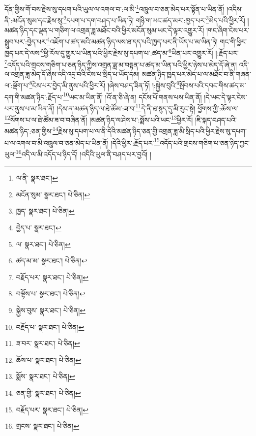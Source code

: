 དོན་གྱིས་གོ་བས་རྗེས་སུ་དཔག་པའི་ཡུལ་ལ་འགལ་བ་:ལ་མི་\footnote{ལ་ནི་  སྣར་ཐང་། }འཁྲུལ་བ་ཅན་མེད་པར་སྟོན་པ་ཡིན་ནོ། །འདིས་ནི་:མངོན་སུམ་དང་རྗེས་སུ་\footnote{མངོན་སུམ་  སྣར་ཐང་།  པེ་ཅིན། }དཔག་པ་དག་བཤད་པ་ཡིན་ཏེ། གཉི་ག་ཡང་ཚད་མར་:ཁྱད་པར་\footnote{ཁྱད་  སྣར་ཐང་།  པེ་ཅིན། }མེད་པའི་ཕྱིར་རོ། །མཚན་ཉིད་དང་ལྡན་པ་གཅིག་ལ་འགྲན་ཟླ་མཐོང་བའི་ཕྱིར་མངོན་སུམ་ཡང་དེ་ལྟར་འགྱུར་རོ། །གང་ཞིག་ངེས་པར་སྒྲུབ་པར་:བྱེད་པར་\footnote{བྱེད་པ་  སྣར་ཐང་། }འཇོག་པ་ཚད་མའི་མཚན་ཉིད་ལས་ཐ་དད་པའི་ཁྱད་པར་ནི་ཡོད་པ་མ་ཡིན་ཏེ། གང་གི་ཕྱིར་ཁྱད་པར་དེ་ལས་\footnote{ལ་  སྣར་ཐང་།  པེ་ཅིན། }ཕྱི་རོལ་དུ་གྱུར་པ་ཡིན་པའི་ཕྱིར་རྗེས་སུ་དཔག་པ་:ཚད་མ་\footnote{ཚད་མ་མ་  སྣར་ཐང་།  པེ་ཅིན། }ཡིན་པར་འགྱུར་རོ། །:རྗོད་པར་\footnote{བརྗོད་པར་  སྣར་ཐང་།  པེ་ཅིན། }འདོད་པའི་གྲངས་གཅིག་པ་ཅན་ཉིད་ཀྱིས་འགྲན་ཟླ་མ་བསྟན་པ་ཚད་མ་ཡིན་པའི་ཕྱིར་ཉེས་པ་མེད་དོ་ཞེ་ན། འདི་ལ་འགྲན་ཟླ་མེད་དོ་ཞེས་འདི་འདྲ་བའི་ངེས་པ་སྲིད་པ་ཡོད་དམ། མཚན་ཉིད་ཁྱད་པར་མེད་པ་ལ་མཐོང་བ་ནི་གཞན་ལ་:ལྡོག་པ་\footnote{བལྟོས་པ་  སྣར་ཐང་།  པེ་ཅིན། }ངེས་པར་བྱེད་མི་ནུས་པའི་ཕྱིར་རོ། །ཞེས་བཤད་ཟིན་ཏོ། །:སྐྱེས་བུའི་\footnote{སྐྱེས་བུས་  སྣར་ཐང་།  པེ་ཅིན། }སྤོབས་པའི་དབང་གིས་ཚད་མ་དག་གི་མཚན་ཉིད་:རྗོད་པ་\footnote{བརྗོད་པ་  སྣར་ཐང་།  པེ་ཅིན། }ཡང་མ་ཡིན་ནོ། །འོ་ན་ཅི་ཞེ་ན། དངོས་པོ་གནས་པས་ཡིན་ནོ། །དེ་ཡང་དེ་ལྟར་ངེས་པར་ནུས་པ་མ་ཡིན་ནོ། །དེས་ན་མཚན་ཉིད་ལ་ཐེ་ཚོམ་:ཟ་བ་\footnote{ཟ་བར་  སྣར་ཐང་།  པེ་ཅིན། }དེ་ནི་ཐ་སྙད་དུ་མི་རུང་སྟེ། ཕྱོགས་ཀྱི་:ཆོས་ལ་\footnote{ཆོས་པ་  སྣར་ཐང་།  པེ་ཅིན། }སོགས་པ་ལ་ཐེ་ཚོམ་ཟ་བ་བཞིན་ནོ། །མཚན་ཉིད་ལ་ཤེས་པ་:སྨོས་པའི་ཡང་\footnote{སྨོས་  སྣར་ཐང་།  པེ་ཅིན། }ཕྱིར་རོ། །ཇི་སྐད་བཤད་པའི་མཚན་ཉིད་:ཅན་གྱིས་\footnote{ཅན་གྱི་  སྣར་ཐང་།  པེ་ཅིན། }རྗེས་སུ་དཔག་པ་ལ་ནི་དེའི་མཚན་ཉིད་ཅན་གྱི་འགྲན་ཟླ་མི་སྲིད་པའི་ཕྱིར་རྗེས་སུ་དཔག་པ་ལ་འགལ་བ་མི་འཁྲུལ་བ་ཅན་མེད་པ་ཡིན་ནོ། །དེའི་ཕྱིར་:རྗོད་པར་\footnote{བརྗོད་པར་  སྣར་ཐང་།  པེ་ཅིན། }འདོད་པའི་གྲངས་གཅིག་པ་ཅན་ཉིད་ཀྱང་ཡུལ་\footnote{གྲངས་  སྣར་ཐང་།  པེ་ཅིན། }འདི་ལ་མི་འདོད་པ་ཉིད་དོ། །འདིའི་ཡུལ་ནི་བཤད་པར་བྱའོ། །
